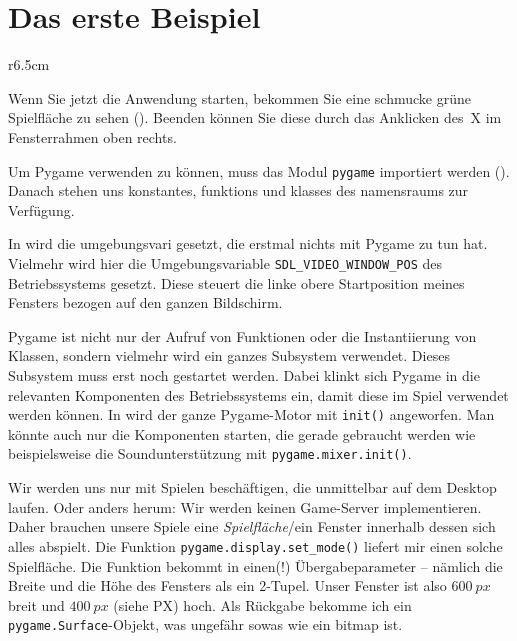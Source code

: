 \section{Das erste Beispiel}


\begin{wrapfigure}[11]{r}{6.5cm}
    \vspace{-1em}
\end{wrapfigure}
Wenn Sie jetzt die Anwendung starten, bekommen Sie eine schmucke grüne Spielfläche zu sehen (). Beenden können Sie diese durch das Anklicken des~X im Fensterrahmen oben rechts.


Um Pygame verwenden zu können, muss das Modul \texttt{pygame} importiert werden (). Danach stehen uns \glspl{konstante}, \glspl{funktion} und \glspl{klasse} des \Gls{namensraum}s zur Verfügung. 

In   wird die \Gls{umgebungsvari} gesetzt, die erstmal nichts mit Pygame zu tun hat. Vielmehr wird hier die Umgebungsvariable \texttt{SDL\_VIDEO\_WINDOW\_POS} des Betriebssystems gesetzt. Diese steuert die linke obere Startposition meines Fensters bezogen auf den ganzen Bildschirm. 

Pygame ist nicht nur der Aufruf von Funktionen oder die Instantiierung von Klassen, sondern vielmehr wird ein ganzes Subsystem verwendet. Dieses Subsystem muss erst noch gestartet werden. Dabei klinkt sich Pygame in die relevanten Komponenten des Betriebssystems ein, damit diese im Spiel verwendet werden können. In  wird der ganze Pygame-Motor mit \texttt{init()} angeworfen. Man könnte auch nur die Komponenten starten, die gerade gebraucht werden wie beispielsweise die Soundunterstützung mit \texttt{pygame.mixer.init()}.

Wir werden uns nur mit Spielen beschäftigen, die unmittelbar auf dem Desktop laufen. Oder anders herum: Wir werden keinen Game-Server implementieren. Daher brauchen unsere Spiele eine \emph{Spielfläche}/ein Fenster innerhalb dessen sich alles abspielt. Die Funktion \texttt{pygame.display.set\_mode()} liefert mir einen solche Spielfläche. Die Funktion bekommt in  einen(!) Übergabeparameter -- nämlich die Breite und die Höhe des Fensters als ein 2-Tupel. Unser Fenster ist also $600~px$ breit und $400~px$ (siehe \Gls{PX}) hoch. Als Rückgabe bekomme ich ein \texttt{pygame.Surface}-Objekt, was ungefähr sowas wie ein \Gls{bitmap} ist. 

